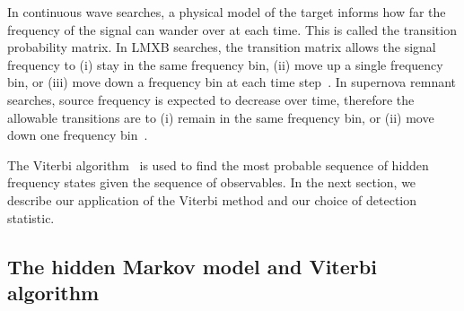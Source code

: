 \documentclass[paper-main.tex]{subfiles}
\begin{document}
In continuous wave searches, a physical model of the target informs how far the frequency of the signal can wander over at each time. 
This is called the transition probability matrix. 
In LMXB searches, the transition matrix allows the signal frequency to (i) stay in the same frequency bin, (ii) move up a single frequency bin, or (iii) move down a frequency bin at each time step~\cite{ScoX1O2Viterbi:2019, ScoX1ViterbiO1:2017,  MiddletonEtAlO2LMXBs:2020}. 
In supernova remnant searches, source frequency is expected to decrease over time, therefore the allowable transitions are to (i) remain in the same frequency bin, or (ii) move down one frequency bin~\cite{MillhouseStrangMelatos:2020, SunEtAlSNR:2018}. 


The Viterbi algorithm~\cite{Viterbi:1967} is used to find the most probable sequence of hidden frequency states given the sequence of observables.
In the next section, we describe our application of the Viterbi method and our choice of detection statistic. 




\subsection{The hidden Markov model and Viterbi algorithm}
\label{sec:viterbi}
\end{document}
